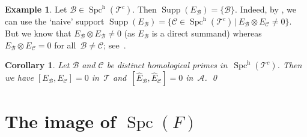 \documentclass[JEP,XML,SOM,Unicode]{cedram}
\numberwithin{equation}{section}
\newtheorem{Cor}[equation]{Corollary}
\theoremstyle{definition}
\newtheorem{Exa}[equation]{Example}
\DeclareMathOperator{\Spc}{Spc}
\newcommand{\cat}[1]{\mathscr{#1}}
\newcommand{\SET}[2]{\big\{#1\,\big|\,#2\big\}}
\newcommand{\smallh}{\mathrm{h}}
\DeclareMathOperator{\Supp}{Supp}
\newcommand{\cA}{\cat{A}}
\newcommand{\cB}{\cat{B}}
\newcommand{\cC}{\cat{C}}
\newcommand{\cT}{\cat{T}}
\newcommand{\EB}{E_{\cB}}
\newcommand{\EC}{E_{\cC}}
\newcommand{\hEB}{\hat E_{\cB}}
\newcommand{\hEC}{\hat E_{\cC}}
\newcommand{\SpchT}{\Spch(\cat{T}^c)}
\newcommand{\Spch}{\Spc^{\smallh}}
\begin{document}
\begin{Exa}
\label{Exa:Supp(EB)}
Let $\cB\in\SpchT$. Then $\Supp(\EB)=\{\cB\}$. Indeed, by , we can use the `naive' support $\Supp(\EB)=\SET{\cC\in\SpchT}{\EB\otimes\EC\neq 0}$. But we know that $\EB\otimes\EB\neq 0$ (as $\EB$ is a direct summand) whereas $\EB\otimes\EC=0$ for all~$\cB\neq\cC$; see~\cite[Prop.\,5.3]{Balmer20a}.
\end{Exa}

\begin{Cor}
\label{Cor:[EB,EC]}
Let $\cB$ and $\cC$ be distinct homological primes in~$\SpchT$. Then we have $[\EB,\EC]=0$ in~$\cT$ and~$[\hEB,\hEC]=0$ in~$\cA$.
\qed
\end{Cor}

\section{The image of \texorpdfstring{$\Spc(F)$}{Spc}}
\label{sec:im(Spc(F))}
\end{document}
